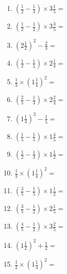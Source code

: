 \documentclass[12pt]{article}
\begin{document}
\begin{enumerate}
\item \large $ \left( \frac{1}{2} - \frac{1}{3} \right) \times 3 \frac{1}{5} = $ \vspace{1.6cm}
\item \large $ \left( \frac{1}{2} - \frac{1}{2} \right) \times 3 \frac{3}{5} = $ \vspace{1.6cm}
\item \large $ \left( 2 \frac{1}{2} \right)^2 - \frac{2}{3} = $ \vspace{1.6cm}
\item \large $ \left( \frac{1}{2} - \frac{1}{5} \right) \times 2 \frac{1}{4} = $ \vspace{1.6cm}
\item \large $ \frac{1}{3} \times \left( 1 \frac{1}{4} \right)^2 = $ \vspace{1.6cm}
\item \large $ \left( \frac{2}{5} - \frac{1}{3} \right) \times 2 \frac{2}{4} = $ \vspace{1.6cm}
\item \large $ \left( 1 \frac{1}{3} \right)^2 - \frac{1}{5} = $ \vspace{1.6cm}
\item \large $ \left( \frac{1}{5} - \frac{1}{5} \right) \times 1 \frac{4}{5} = $ \vspace{1.6cm}
\item \large $ \left( \frac{1}{2} - \frac{1}{3} \right) \times 1 \frac{1}{2} = $ \vspace{1.6cm}
\item \large $ \frac{1}{3} \times \left( 1 \frac{1}{4} \right)^2 = $ \vspace{1.6cm}
\newpage
\item \large $ \left( \frac{3}{5} - \frac{1}{5} \right) \times 1 \frac{1}{2} = $ \vspace{1.6cm}
\item \large $ \left( \frac{3}{5} - \frac{1}{2} \right) \times 2 \frac{1}{5} = $ \vspace{1.6cm}
\item \large $ \left( \frac{4}{5} - \frac{1}{2} \right) \times 3 \frac{2}{5} = $ \vspace{1.6cm}
\item \large $ \left( 1 \frac{1}{2} \right)^2 + \frac{1}{2} = $ \vspace{1.6cm}
\item \large $ \frac{1}{2} \times \left( 1 \frac{1}{3} \right)^2 = $ \vspace{1.6cm}

\end{enumerate}
\end{document}
